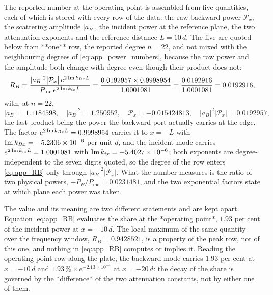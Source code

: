 The reported number at the operating point is assembled from five quantities,
each of which is stored with every row of the data: the raw backward power
$\mathcal{P}_x$, the scattering amplitude $|a_B|$, the incident power at the
reference plane, the two attenuation exponents and the reference distance
$L=10\,d$.  The five are quoted below from **one** row, the reported degree
$n=22$, and not mixed with the neighbouring degrees of
\eqref{eq:app_power_numbers}, because the raw power and the amplitude both change
with degree even though their product does not:
\begin{equation}
\label{eq:app_RB}
R_B=\frac{|a_B|^{2}\bigl|\mathcal{P}_x\bigr|\,e^{2\operatorname{Im} k_{Bx}L}}
{P_{\text{inc}}\,e^{2\operatorname{Im} k_{ix}L}}
=\frac{0.0192957\times0.9998954}{1.0001081}
=\frac{0.0192916}{1.0001081}=0.0192916 ,
\end{equation}
with, at $n=22$,
\begin{equation}
\label{eq:app_RB_inputs}
|a_B|=1.1184598,\quad
|a_B|^{2}=1.250952,\quad
\mathcal{P}_x=-0.015424813,\quad
|a_B|^{2}\bigl|\mathcal{P}_x\bigr|=0.0192957 ,
\end{equation}
the last product being the power the backward port actually carries at the edge.
The factor $e^{2\operatorname{Im} k_{Bx}L}=0.9998954$ carries it to $x=-L$ with
$\operatorname{Im} k_{Bx}=-5.2306\times10^{-6}$ per unit $d$, and the incident mode carries
$e^{2\operatorname{Im} k_{ix}L}=1.0001081$ with $\operatorname{Im} k_{ix}=+5.4027\times10^{-6}$; both
exponents are degree-independent to the seven digits quoted, so the degree of the
row enters \eqref{eq:app_RB} only through $|a_B|^{2}|\mathcal{P}_x|$.  What the
number measures is the ratio of two physical powers,
$-P_B/P_{\text{inc}}=0.0231481$, and the two exponential factors state at which
plane each power was taken.

The value and its meaning are two different statements and are kept apart.
Equation \eqref{eq:app_RB} evaluates the share at the *operating point*,
$1.93$ per cent of the incident power at $x=-10\,d$.  The local maximum of the
same quantity over the frequency window, $R_B=0.9428521$, is a property of the
peak row, not of this one, and nothing in \eqref{eq:app_RB} computes or implies
it.  Reading the operating-point row along the plate, the backward mode carries
$1.93$ per cent at $x=-10\,d$ and $1.93\,\%\times e^{-2.13\times10^{-4}}$ at
$x=-20\,d$: the decay of the share is governed by the *difference* of the two
attenuation constants, not by either one of them.
